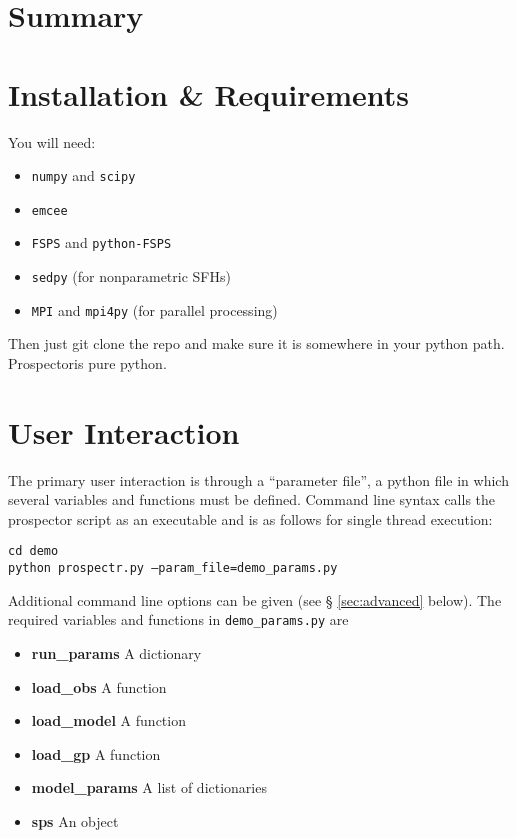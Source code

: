 \documentclass[12pt, letterpaper, preprint]{aastex}
\newcommand{\prospector}{Prospector}
\begin{document}
\section{Summary}

\section{Installation \& Requirements}
You will need:

\begin{itemize}
\item \texttt{numpy} and \texttt{scipy}
\item \texttt{emcee}
\item \texttt{FSPS} and \texttt{python-FSPS}
\item \texttt{sedpy} (for nonparametric SFHs)
\item \texttt{MPI} and \texttt{mpi4py} (for parallel processing)
\end{itemize}

Then just git clone the repo and make sure it is somewhere in your
python path.  \prospector is pure python.

\section{User Interaction}
The primary user interaction is through a ``parameter file'', a python
file in which several variables and functions must be defined. Command
line syntax calls the prospector script as an executable and is as
follows for single thread execution:
\begin{center}
\texttt{cd demo} \\
\texttt{python prospectr.py --param\_file=demo\_params.py}
\end{center}
Additional command line options can be given (see \S
\ref{sec:advanced} below). The required variables and functions in
\texttt{demo\_params.py} are
\begin{itemize}
\item {\bf run\_params} A dictionary
\item {\bf load\_obs} A function
\item {\bf load\_model} A function
\item {\bf load\_gp} A function
\item {\bf model\_params} A list of dictionaries
\item {\bf sps} An object
\end{itemize}
\end{document}
